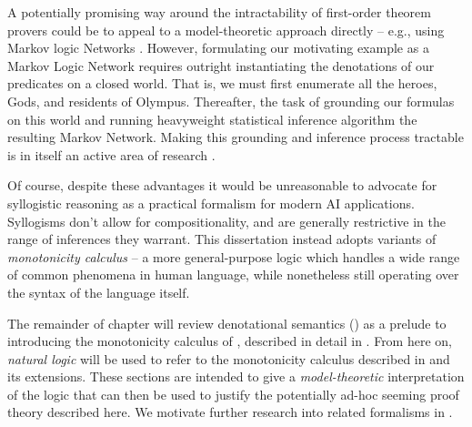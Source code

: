 A potentially promising way around the intractability of first-order theorem provers
  could be to appeal to a model-theoretic approach directly -- e.g., using
  Markov logic Networks \cite{key:2006richardson-mln}.
However, formulating our motivating example as a Markov Logic Network requires outright instantiating
  the denotations of our predicates on a closed world.
That is, we must first enumerate all the heroes, Gods, and residents of Olympus.
Thereafter, the task of grounding our formulas on this world and running heavyweight
  statistical inference algorithm the resulting Markov Network.
Making this grounding and inference process tractable is in itself an active area of
  research \cite{key:2011niu-tuffy,key:2014zhang-dimmwitted}.


Of course, despite these advantages it would be unreasonable to advocate for syllogistic
  reasoning as a practical formalism for modern AI applications.
Syllogisms don't allow for compositionality, and are generally restrictive in
  the range of inferences they warrant.
This dissertation instead adopts variants of \textit{monotonicity calculus}
  \cite{key:1986benthem-natlog,key:1991valencia-natlog}
  -- a more general-purpose logic which handles a wide range of common phenomena in human
  language, while nonetheless still operating over the syntax of the language itself.


%
%
The remainder of chapter will review denotational semantics ()
  as a prelude to introducing the monotonicity calculus of ,
  described in detail in .
From here on, \textit{natural logic} will be used to refer to the monotonicity calculus
  described in  and its extensions.
These sections are intended to give a \textit{model-theoretic} interpretation of the logic
  that can then be used to justify the potentially ad-hoc seeming proof theory described
  here.
We motivate further research into related formalisms in .
